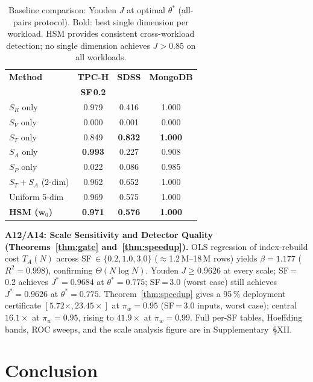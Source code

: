 \documentclass[10pt,twocolumn,a4paper]{article}
\newcommand{\SR}{S_{R}}
\newcommand{\SV}{S_{V}}
\newcommand{\ST}{S_{T}}
\newcommand{\SA}{S_{A}}
\newcommand{\SPER}{S_{P}}
\newcommand{\thetastar}{\theta^{*}}
\begin{document}
\begin{table}[!htb]\centering\scriptsize
\caption{Baseline comparison: Youden $J$ at optimal $\theta^{*}$
(all-pairs protocol). Bold: best single dimension per workload.
HSM provides consistent cross-workload detection;
no single dimension achieves $J\!>\!0.85$ on all workloads.}\label{tab:baselines}
\setlength{\tabcolsep}{3pt}
\begin{tabular}{@{}lccc@{}}
\toprule
\textbf{Method} & \textbf{TPC-H} & \textbf{SDSS} & \textbf{MongoDB}\\
 & \textbf{SF\,0.2} & & \\
\midrule
$\SR$ only       & 0.979 & 0.416 & 1.000\\
$\SV$ only       & 0.000 & 0.001 & 0.000\\
$\ST$ only       & 0.849 & \textbf{0.832} & \textbf{1.000}\\
$\SA$ only       & \textbf{0.993} & 0.227 & 0.908\\
$\SPER$ only     & 0.022 & 0.086 & 0.985\\
\midrule
$\ST\!+\!\SA$ (2-dim) & 0.962 & 0.652 & 1.000\\
Uniform 5-dim    & 0.969 & 0.575 & 1.000\\
\textbf{HSM ($\mathbf{w}_0$)} & \textbf{0.971} & \textbf{0.576} & \textbf{1.000}\\
\bottomrule
\end{tabular}
\end{table}

\textbf{A12/A14: Scale Sensitivity and Detector Quality
(Theorems~\ref{thm:gate} and~\ref{thm:speedup}).}
OLS regression of index-rebuild cost $T_A(N)$ across
SF\,$\in\{0.2,1.0,3.0\}$ ($\approx$1.2\,M--18\,M rows) yields
$\beta\!=\!1.177$ ($R^2\!=\!0.998$), confirming $\Theta(N\log N)$.
Youden $J\!\ge\!0.9626$ at every scale; SF\,=\,0.2 achieves
$J^{*}\!=\!0.9684$ at $\thetastar\!=\!0.775$; SF\,=\,3.0 (worst case)
still achieves $J^{*}\!=\!0.9626$ at $\thetastar\!=\!0.775$.
Theorem~\ref{thm:speedup} gives a 95\,\% deployment certificate
$[5.72\times,23.45\times]$ at $\pi_w\!=\!0.95$ (SF\,=\,3.0 inputs,
worst case); central $16.1\times$ at $\pi_w\!=\!0.95$, rising to
$41.9\times$ at $\pi_w\!=\!0.99$.
Full per-SF tables, Hoeffding bands, ROC sweeps, and the scale
analysis figure are in Supplementary~\S XII.

\section{Conclusion}
\end{document}
